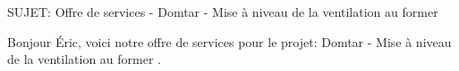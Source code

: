 SUJET: Offre de services - Domtar - Mise à niveau de la ventilation au former \par Bonjour Éric, voici notre offre de services pour le projet: Domtar - Mise à niveau de la ventilation au former .